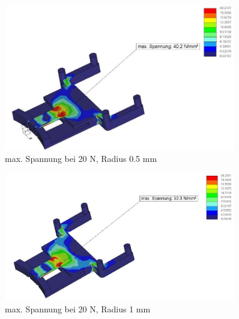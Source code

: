 			\begin{figure}[H]
			\begin{centering}
			\includegraphics[width = 0.9\textwidth]{Bilder/max_spannung_f20_r0_5}
			\par\end{centering}
			\caption{max. Spannung bei 20 N, Radius 0.5 mm}
			\label{max_spannung_f20_r0_5}
			\end{figure}

			\begin{figure}[H]
			\begin{centering}
			\includegraphics[width = 0.9\textwidth]{Bilder/max_spannung_f20_r1}
			\par\end{centering}
			\caption{max. Spannung bei 20 N, Radius 1 mm}
			\label{max_spannung_f20_r1}
			\end{figure}


